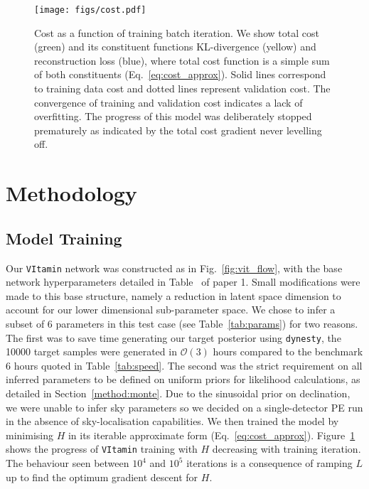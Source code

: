 \documentclass[a4paper]{jpconf}
\newcommand{\RNum}[1]{\uppercase\expandafter{\romannumeral #1\relax}}
\begin{document}
\begin{figure}
	\centering
	\texttt{[image: figs/cost.pdf]}
	\caption{Cost as a function of training batch iteration. We show total cost (green) and its constituent functions KL-divergence (yellow) and reconstruction loss (blue), where total cost function is a simple sum of both constituents (Eq.~\ref{eq:cost_approx}). Solid lines correspond to training data cost and dotted lines represent validation cost. The convergence of training and validation cost indicates a lack of overfitting. The progress of this model was deliberately stopped prematurely as indicated by the total cost gradient never levelling off. }
	\label{fig:cost}
\end{figure}

\section{Methodology}\label{method}

\subsection{Model Training}\label{methods:training}

Our \texttt{VItamin} network was constructed as in Fig.~\ref{fig:vit_flow}, with the base network hyperparameters detailed in Table~\RNum{3} of paper 1. Small modifications were made to this base structure, namely a reduction in latent space dimension to account for our lower dimensional sub-parameter space. We chose to infer a subset of 6 parameters in this test case (see Table~\ref{tab:params}) for two reasons. The first was to save time generating our target posterior using \texttt{dynesty}, the 10000 target samples were generated in $\mathcal{O}(3)$ hours compared to the benchmark 6 hours quoted in Table~\ref{tab:speed}. The second was the strict requirement on all inferred parameters to be defined on uniform priors for likelihood calculations, as detailed in Section~\ref{method:monte}. Due to the sinusoidal prior on declination, we were unable to infer sky parameters so we decided on a single-detector PE run in the absence of sky-localisation capabilities. We then trained the model by minimising $H$ in its iterable approximate form (Eq.~\ref{eq:cost_approx}). Figure~\ref{fig:cost} shows the progress of \texttt{VItamin} training with $H$ decreasing with training iteration. The behaviour seen between $10^4$ and $10^5$ iterations is a consequence of ramping $L$ up to find the optimum gradient descent for $H$.
\end{document}
